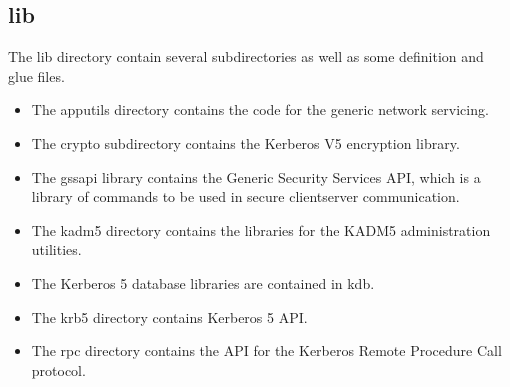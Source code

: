 \documentclass[letterpaper,10pt,english]{sphinxmanual}
\begin{document}
\subsection{lib}
\label{\detokenize{build/directory_org:lib}}\label{\detokenize{build/directory_org:id1}}
\sphinxAtStartPar
The lib directory contain several subdirectories as well as some
definition and glue files.
\begin{itemize}
\item {} 
\sphinxAtStartPar
The apputils directory contains the code for the generic network
servicing.

\item {} 
\sphinxAtStartPar
The crypto subdirectory contains the Kerberos V5 encryption
library.

\item {} 
\sphinxAtStartPar
The gssapi library contains the Generic Security Services API,
which is a library of commands to be used in secure client\sphinxhyphen{}server
communication.

\item {} 
\sphinxAtStartPar
The kadm5 directory contains the libraries for the KADM5
administration utilities.

\item {} 
\sphinxAtStartPar
The Kerberos 5 database libraries are contained in kdb.

\item {} 
\sphinxAtStartPar
The krb5 directory contains Kerberos 5 API.

\item {} 
\sphinxAtStartPar
The rpc directory contains the API for the Kerberos Remote
Procedure Call protocol.

\end{itemize}
\end{document}
